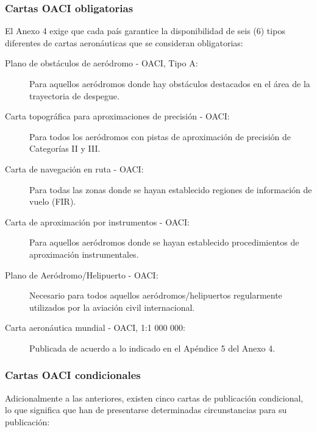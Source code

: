 \subsubsection{Cartas OACI obligatorias}

El Anexo 4 exige que cada pa\'is garantice la disponibilidad de seis (6) 
tipos diferentes de cartas aeron\'auticas que se consideran obligatorias:

\begin{description}

\item[  Plano de obst\'aculos de aer\'odromo - OACI, Tipo A:] Para aquellos
  aer\'odromos donde hay obst\'aculos destacados en el \'area de la
  \gls{trayectoria} de despegue.

  \item[ Carta topogr\'afica para aproximaciones de precisi\'on - OACI:] Para
  todos los aer\'odromos con pistas de aproximaci\'on de precisi\'on de
  Categor\'ias II y III.

  \item[ Carta de navegaci\'on en ruta - OACI:] Para todas las zonas donde se
  hayan establecido regiones de informaci\'on de vuelo (FIR).

  \item[ Carta de aproximaci\'on por instrumentos - OACI:] Para aquellos
  aer\'odromos donde se hayan establecido procedimientos de aproximaci\'on
  instrumentales.

  \item[ Plano de Aer\'odromo/Helipuerto - OACI:] Necesario para todos
  aquellos aer\'odromos/helipuertos regularmente utilizados por la
  aviaci\'on civil internacional.

  \item[ Carta aeron\'autica mundial - OACI, 1:1 000 000:] Publicada de
  acuerdo a lo indicado en el Ap\'endice 5 del Anexo 4.
\end{description}

\subsubsection{Cartas OACI condicionales}

Adicionalmente a las anteriores, existen cinco cartas de publicaci\'on condicional, lo que significa que han de presentarse determinadas circunstancias para su publicaci\'on:

